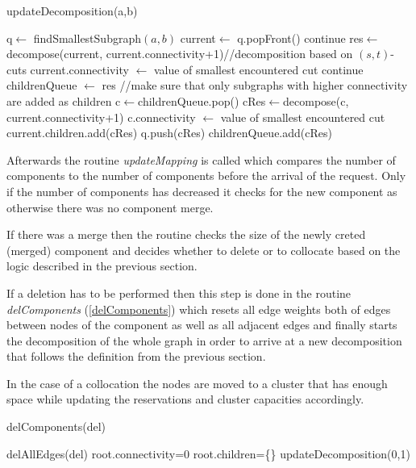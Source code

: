 \documentclass[a4paper,xcolor=dvipsnames, tikz, 12pt]{article}
\theoremstyle{definition}
\begin{document}
\begin{algorithm}
	\caption{updateDecomposition(a,b)}
	\label{updateDecomposition}
	\begin{algorithmic}
		\STATE q$\leftarrow$ findSmallestSubgraph$(a,b)$
		\STATE current$\leftarrow$ q.popFront()
		\STATE continue
		\ENDIF
		\STATE res$\leftarrow$ decompose(current, current.connectivity+1)//decomposition based on $(s,t)$-cuts
		\STATE current.connectivity $\leftarrow$ value of smallest encountered cut
		\STATE continue
		\ENDIF
		\STATE childrenQueue $\leftarrow$ res
		\STATE //make sure that only subgraphs with higher connectivity are added as children
		\STATE c$\leftarrow$childrenQueue.pop()
		\STATE cRes$\leftarrow$decompose(c, current.connectivity+1)
		\STATE c.connectivity $\leftarrow$ value of smallest encountered cut
		\STATE current.children.add(cRes)
		\STATE q.push(cRes)
		\ENDIF
		\ELSE
		\STATE childrenQueue.add(cRes)
		\ENDIF
		\ENDWHILE
		\ENDWHILE
	\end{algorithmic}		
\end{algorithm}

Afterwards the routine \textit{updateMapping} is called which compares the number of components to the number of components before the arrival of the request. Only if the number of components has decreased it checks for the new component as otherwise there was no component merge. 

If there was a merge then the routine checks the size of the newly creted (merged) component and decides whether to delete or to collocate based on the logic described in the previous section.

If a deletion has to be performed then this step is done in the routine \textit{delComponents} (\cref{delComponents}) which resets all edge weights both of edges between nodes of the component as well as all adjacent edges and finally starts the decomposition of the whole graph in order to arrive at a new decomposition that follows the definition from the previous section.

In the case of a collocation the nodes are moved to a cluster that has enough space while updating the reservations and cluster capacities accordingly.



\begin{algorithm}
	\caption{delComponents(del)}
	\label{delComponents}
	\begin{algorithmic}
		\STATE delAllEdges(del)
		\STATE root.connectivity=0
		\STATE root.children=\{\}
		\STATE updateDecomposition(0,1)
	\end{algorithmic}
\end{algorithm}
\end{document}

